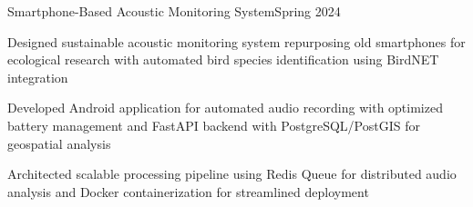 \begin{joblong}{Smartphone-Based Acoustic Monitoring System}{Spring 2024}
	\item Designed sustainable acoustic monitoring system repurposing old smartphones for ecological research with automated bird species identification using BirdNET integration
	\item Developed Android application for automated audio recording with optimized battery management and FastAPI backend with PostgreSQL/PostGIS for geospatial analysis
	\item Architected scalable processing pipeline using Redis Queue for distributed audio analysis and Docker containerization for streamlined deployment
\end{joblong}
